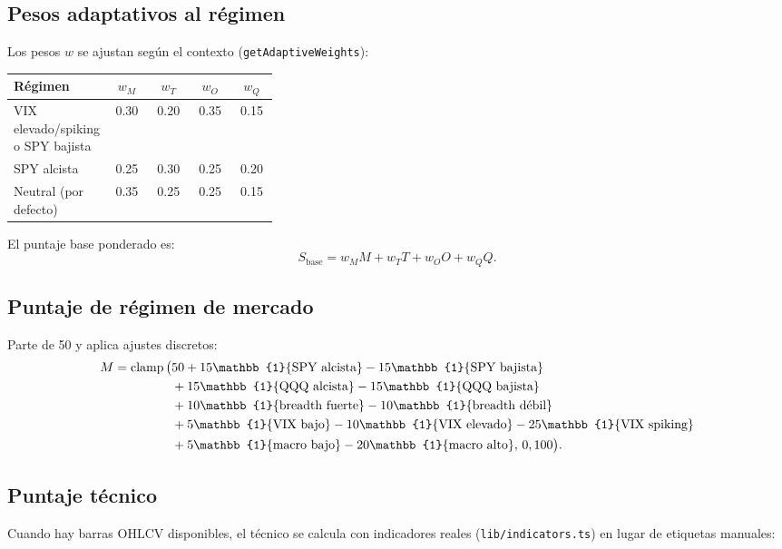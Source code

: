\documentclass[11pt,letterpaper]{article}
\newcommand{\ind}[1]{\mathbb{1}\{#1\}}
\newcommand{\clp}{\operatorname{clamp}}
\begin{document}
\subsection{Pesos adaptativos al régimen}

Los pesos $w$ se ajustan según el contexto (\texttt{getAdaptiveWeights}):

\begin{longtable}{p{0.34\linewidth} cccc}
\toprule
\textbf{Régimen} & $w_M$ & $w_T$ & $w_O$ & $w_Q$ \\
\midrule
VIX elevado/spiking o SPY bajista & 0.30 & 0.20 & 0.35 & 0.15 \\
SPY alcista & 0.25 & 0.30 & 0.25 & 0.20 \\
Neutral (por defecto) & 0.35 & 0.25 & 0.25 & 0.15 \\
\bottomrule
\end{longtable}

El puntaje base ponderado es:
\begin{equation}
S_{\text{base}} = w_M M + w_T T + w_O O + w_Q Q.
\end{equation}

\subsection{Puntaje de régimen de mercado}

Parte de 50 y aplica ajustes discretos:
\begin{align}
M = \clp\big(&50
 + 15\ind{\text{SPY alcista}} - 15\ind{\text{SPY bajista}} \notag\\
&+ 15\ind{\text{QQQ alcista}} - 15\ind{\text{QQQ bajista}} \notag\\
&+ 10\ind{\text{breadth fuerte}} - 10\ind{\text{breadth débil}} \notag\\
&+ 5\ind{\text{VIX bajo}} - 10\ind{\text{VIX elevado}} - 25\ind{\text{VIX spiking}} \notag\\
&+ 5\ind{\text{macro bajo}} - 20\ind{\text{macro alto}},\,0,100\big).
\end{align}

\subsection{Puntaje técnico}

Cuando hay barras OHLCV disponibles, el técnico se calcula con indicadores reales
(\texttt{lib/indicators.ts}) en lugar de etiquetas manuales:
\end{document}
